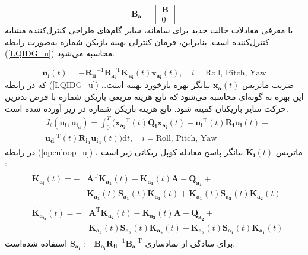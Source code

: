 \documentclass{CCI2020}
\begin{document}
\begin{equation}
	\boldsymbol{B_a} = \begin{bmatrix}
		\boldsymbol{B}\\
		0
	\end{bmatrix}
\end{equation}
با معرفی معادلات حالت جدید برای سامانه، سایر گام‌های طراحی کنترل‌کننده
مشابه کنترل‌کننده
است. بنابراین، فرمان کنترلی بهینه  بازیکن شماره  به‌صورت رابطه
(\ref{LQIDG_u})
محاسبه می‌شود.

\begin{equation}\label{LQIDG_u}
	\boldsymbol{u_i}(t) = -\boldsymbol{R_{ii}}^{-1}\boldsymbol{B_{a_i}}^\mathrm{T}\boldsymbol{K_{a_i}}(t)\boldsymbol{x_{a_i}}(t),\quad i = \text{Roll, Pitch, Yaw}
\end{equation}
که در رابطه 
(\ref{LQIDG_u})
،ضریب ماتریس $\boldsymbol{x_a}(t)$ بیانگر بهره بازخورد بهینه است. این بهره به گونه‌ای محاسبه می‌شود که تابع هزینه مربعی بازیکن شماره  با فرض بدترین حرکت سایر بازیکنان کمینه شود. تابع هزینه بازیکن شماره  در زیر آورده شده است.
\begin{equation}
	\begin{split}
		&J_i( \boldsymbol{u_i},  \boldsymbol{u_{i_d}}) = \int_{0}^{T}\biggl (\boldsymbol{x_{a_i}} ^\mathrm{T}(t) \boldsymbol{Q_i} \boldsymbol{x_{a_i}}(t)+ 
		\boldsymbol{u_i} ^\mathrm{T}(t) \boldsymbol{R_{i}} \boldsymbol{u_i}(t)+ \\
		&\boldsymbol{u_{d_i}} ^\mathrm{T}(t)\boldsymbol{ R_{i_d} u_{i_d}}(t)
		\biggl) \mathrm{d}t ,\quad i = \text{Roll, Pitch, Yaw}
	\end{split}
\end{equation}
در رابطه 
(\ref{openloop_u})
، ماتریس $\boldsymbol{K_{i}}(t)$ بیانگر پاسخ معادله کوپل ریكاتی
زیر است
\cite{diff_game}:
\begin{equation}\label{coupled_riccatti_LQIDG}
	\begin{split}
		&\begin{split}
			\boldsymbol{\dot{K}_{a_i}}(t) = -&\boldsymbol{A}^\mathrm{T}\boldsymbol{K_{a_1}}(t) - \boldsymbol{K_{a_1}}(t)\boldsymbol{A} - \boldsymbol{Q_{a_1}} + \\ &\boldsymbol{K_{a_1}}(t)\boldsymbol{S_{a_1}}(t)\boldsymbol{K_{a_1}}(t) +  \boldsymbol{K_{a_1}}(t)\boldsymbol{S_{a_2}}(t)\boldsymbol{K_{a_2}}(t)
		\end{split}\\
		&\begin{split}
			\boldsymbol{\dot{K}_{a_{i_d}}}(t) = -&\boldsymbol{A}^\mathrm{T}\boldsymbol{K_{a_2}}(t) - \boldsymbol{K_{a_2}}(t)\boldsymbol{A} - \boldsymbol{Q_{a_2}}+ \\ &\boldsymbol{K_{a_2}}(t)\boldsymbol{S_{a_2}}(t)\boldsymbol{K_{a_2}}(t) + \boldsymbol{K_{a_2}}(t)\boldsymbol{S_{a_1}}(t)\boldsymbol{K_{a_1}}(t)
		\end{split}
	\end{split}
\end{equation}
برای سادگی از نمادسازی
$\boldsymbol{S_{a_i}} := \boldsymbol{B_{a_i}R_{ii}}^{-1}\boldsymbol{B_{a_i}}^\mathrm{T}$
استفاده شده‌است. 
\end{document}

